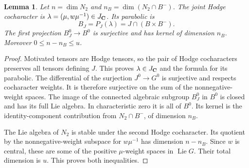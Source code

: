 \documentclass[11pt]{article}
\newtheorem{lemma}[theorem]{Lemma}
\theoremstyle{definition}\newtheorem{definition}[theorem]{Definition}
\theoremstyle{remark}\newtheorem{remark}[theorem]{Remark}
\DeclareMathOperator{\Lie}{Lie}\DeclareMathOperator{\trdeg}{trdeg}
\begin{document}
\begin{lemma}\label{lem:parabolic}
Let $n=\dim N_2$ and $n_B=\dim(N_2\cap B^-)$. The joint Hodge cocharacter is $\lambda=(\mu,w\mu^{-1})\in J_{\mathbf C}$. Its parabolic is
\[
          B_J=P_J(\lambda)=J\cap(B\times B^-).
\]
The first projection $B_J^0\to B^0$ is surjective and has kernel of dimension $n_B$. Moreover $0\leq n-n_B\leq u$.
\end{lemma}
\begin{proof}
Motivated tensors are Hodge tensors, so the pair of Hodge cocharacters preserves all tensors defining $J$. This proves $\lambda\in J_{\mathbf C}$ and the formula for its parabolic. The differential of the surjection $J^0\to G^0$ is surjective and respects cocharacter weights. It is therefore surjective on the sum of the nonnegative-weight spaces. The image of the connected algebraic subgroup $B_J^0$ in $B^0$ is closed and has its full Lie algebra. In characteristic zero it is all of $B^0$. Its kernel is the identity-component contribution from $N_2\cap B^-$, of dimension $n_B$.

The Lie algebra of $N_2$ is stable under the second Hodge cocharacter. Its quotient by the nonnegative-weight subspace for $w\mu^{-1}$ has dimension $n-n_B$. Since $w$ is central, these are some of the positive $\mu$-weight spaces in $\Lie G$. Their total dimension is $u$. This proves both inequalities.
\end{proof}
\end{document}

